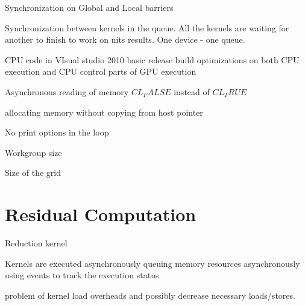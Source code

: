 Synchronization on Global and Local barriers

Synchronization between kernels in the queue. All the kernels are waiting for another to finish to work on nits results.
One device - one queue.

CPU code in VIsual studio 2010 basic release build optimizations on both CPU execution and CPU control parts of GPU execution

Asynchronous reading of memory $CL_FALSE$ instead of $CL_TRUE$

allocating memory without copying from host pointer

No print options in the loop

Workgroup size

Size of the grid

%
%

\section{Residual Computation}

Reduction kernel




Kernels are executed asynchronously
queuing memory resources asynchronously
using events to track the execution status

problem of kernel load overheads and possibly decrease
necessary loads/stores.

